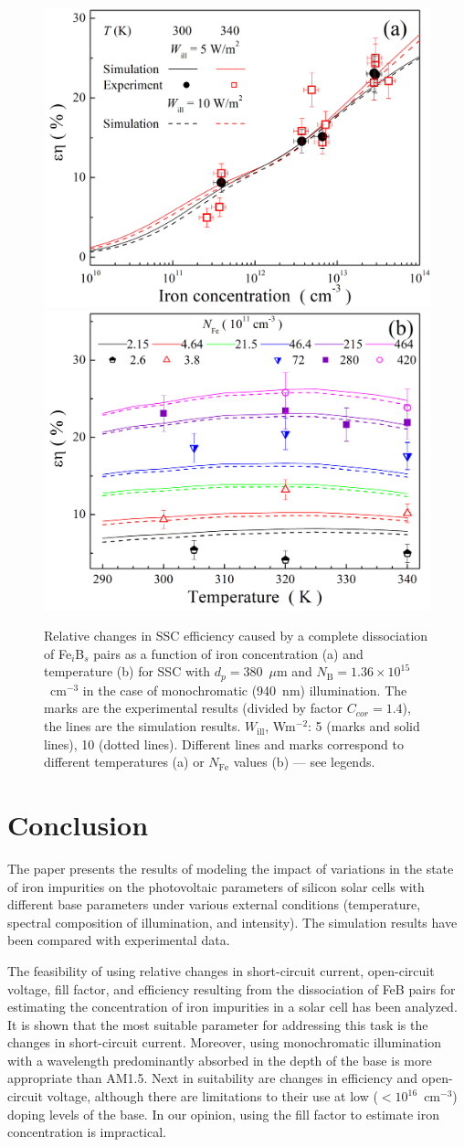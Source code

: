 \documentclass[a4paper,fleqn]{cas-sc}
\begin{document}
\begin{figure}
	\centering
     \includegraphics[width=0.4\linewidth]{Fig11a.png}
     \includegraphics[width=0.4\linewidth]{Fig11b.png}
	  \caption{Relative changes in SSC efficiency caused by a complete
       dissociation of Fe$_i$B$_s$ pairs as a function of iron concentration (a) and
       temperature (b) for SSC with $d_p=380$~$\mu$m and $N_\mathrm{B}=1.36\times10^{15}$~cm$^{-3}$
       in the case of monochromatic (940~nm) illumination.
       The marks are the experimental results (divided by factor $C_{cor}=1.4$), the lines are the simulation results.
       $W_\mathrm{ill}$, Wm$^{-2}$: 5 (marks and solid lines), 10 (dotted lines).
       Different lines and marks correspond to different temperatures (a) or $N_\mathrm{Fe}$ values (b) --- see legends.
}\label{fig11}
\end{figure}

\section{Conclusion}

The paper presents the results of modeling the impact of variations in the state of iron impurities on the photovoltaic parameters of silicon solar cells with different base parameters under various external conditions (temperature, spectral composition of illumination, and intensity). The simulation results have been compared with experimental data.

The feasibility of using relative changes in short-circuit current, open-circuit voltage, fill factor, and efficiency resulting from the dissociation of FeB pairs for estimating the concentration of iron impurities in a solar cell has been analyzed. It is shown that the most suitable parameter for addressing this task is the changes in short-circuit current. Moreover, using monochromatic illumination with a wavelength predominantly absorbed in the depth of the base is more appropriate than AM1.5. Next in suitability are changes in efficiency and open-circuit voltage, although there are limitations to their use at low ($<10^{16}$~cm$^{-3}$) doping levels of the base. In our opinion, using the fill factor to estimate iron concentration is impractical.
\end{document}
